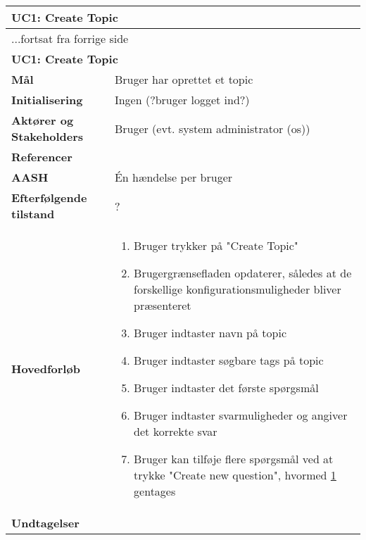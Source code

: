 \begin{center} \centering \label{ucCreateTopic}
	\begin{longtable}{|p{4.6cm}|p{9.4cm}|}  %
	\hline
		\multicolumn{2}{|l|}{\textbf{UC1: Create Topic}} \\\hline
		\endfirsthead
		
		\multicolumn{2}{l}{...fortsat fra forrige side} \\ \hline %
		\multicolumn{2}{|l|}{\textbf{UC1: Create Topic}} \\\hline
		\endhead	
		
		\textbf{Mål}						&Bruger har oprettet et topic
		\\\hline
		\textbf{Initialisering}			&Ingen (?bruger logget ind?)
		\\\hline
		\textbf{Aktører og Stakeholders}	&Bruger (evt. system administrator (os))
		\\\hline 
		\textbf{Referencer}				&%
		\\\hline
		\textbf{AASH}					&Én hændelse per bruger
		\\\hline
		\textbf{Efterfølgende tilstand}	&?
		\\\hline
		\textbf{Hovedforløb}					
			&\begin{enumerate}
				
				\item Bruger trykker på "Create Topic"
				\item Brugergrænsefladen opdaterer, således at de forskellige konfigurationsmuligheder bliver præsenteret
				\item Bruger indtaster navn på topic
				\item Bruger indtaster søgbare tags på topic
				\item \label{ucPunktLabelSpm} Bruger indtaster det første spørgsmål
				\item Bruger indtaster svarmuligheder og angiver det korrekte svar
				\item Bruger kan tilføje flere spørgsmål ved at trykke "Create new question", hvormed \ref{ucPunktLabelSpm} gentages
				
			\end{enumerate}\\\hline
		\textbf{Undtagelser}
			&			
			\\\hline
	\end{longtable} 
\end{center}